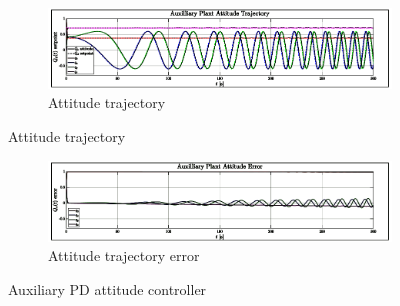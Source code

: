 \begin{figure}[hbtp]
\centering
\vspace{-20pt}
\begin{subfigure}{0.9\textwidth}
\centering
\includegraphics[width=\textwidth]{graphs/XPD_Trajectory}
\vspace{-18pt}
\caption{Attitude trajectory}
\label{fig:XPD_trajectory}
\end{subfigure}
\vspace{-32pt}
\end{figure}
\newpage
\begin{figure}[htbp]
\centering
\ContinuedFloat
\begin{subfigure}{0.9\textwidth}
\centering
\includegraphics[width=\textwidth]{graphs/XPD_Error}
\vspace{-18pt}
\caption{Attitude trajectory error}
\label{fig:dependent_diagonal_error}
\end{subfigure}
\vspace{-10pt}
\caption{Auxiliary PD attitude controller}
\label{fig:auxiliary}
\end{figure}
